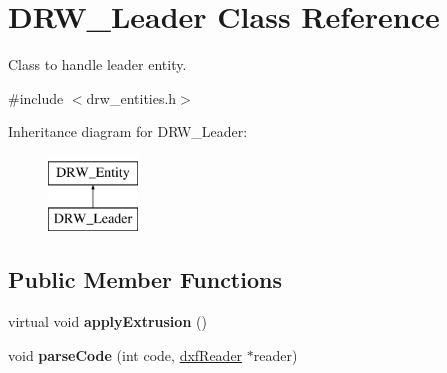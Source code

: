 \hypertarget{classDRW__Leader}{\section{D\-R\-W\-\_\-\-Leader Class Reference}
\label{classDRW__Leader}
}


Class to handle leader entity.  




{\ttfamily \#include $<$drw\-\_\-entities.\-h$>$}

Inheritance diagram for D\-R\-W\-\_\-\-Leader\-:\begin{figure}[H]
\begin{center}
\leavevmode
\includegraphics[height=2.000000cm]{classDRW__Leader}
\end{center}
\end{figure}
\subsection*{Public Member Functions}
\begin{DoxyCompactItemize}
\item 
\hypertarget{classDRW__Leader_a4949b7f618c7a9d839b1e835e52bab00}{virtual void {\bfseries apply\-Extrusion} ()}\label{classDRW__Leader_a4949b7f618c7a9d839b1e835e52bab00}

\item 
\hypertarget{classDRW__Leader_ae803bfea4896739f8fa0fd2f99eec101}{void {\bfseries parse\-Code} (int code, \hyperlink{classdxfReader}{dxf\-Reader} $\ast$reader)}\label{classDRW__Leader_ae803bfea4896739f8fa0fd2f99eec101}

\end{DoxyCompactItemize}
